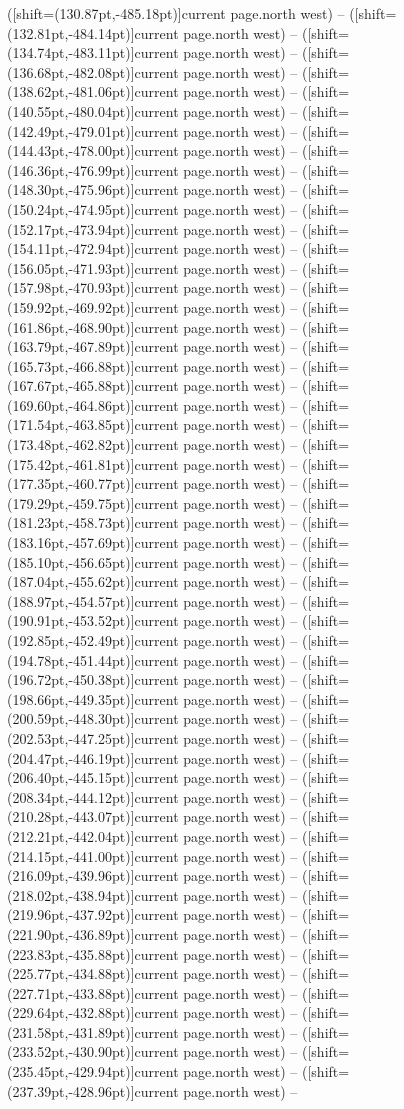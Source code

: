 \documentclass[11pt]{article}
\begin{document}
([shift={(130.87pt,-485.18pt)}]current page.north west) -- ([shift={(132.81pt,-484.14pt)}]current page.north west) -- ([shift={(134.74pt,-483.11pt)}]current page.north west) -- ([shift={(136.68pt,-482.08pt)}]current page.north west) -- ([shift={(138.62pt,-481.06pt)}]current page.north west) -- ([shift={(140.55pt,-480.04pt)}]current page.north west) -- ([shift={(142.49pt,-479.01pt)}]current page.north west) -- ([shift={(144.43pt,-478.00pt)}]current page.north west) -- ([shift={(146.36pt,-476.99pt)}]current page.north west) -- ([shift={(148.30pt,-475.96pt)}]current page.north west) -- ([shift={(150.24pt,-474.95pt)}]current page.north west) -- ([shift={(152.17pt,-473.94pt)}]current page.north west) -- ([shift={(154.11pt,-472.94pt)}]current page.north west) -- ([shift={(156.05pt,-471.93pt)}]current page.north west) -- ([shift={(157.98pt,-470.93pt)}]current page.north west) -- ([shift={(159.92pt,-469.92pt)}]current page.north west) -- ([shift={(161.86pt,-468.90pt)}]current page.north west) -- ([shift={(163.79pt,-467.89pt)}]current page.north west) -- ([shift={(165.73pt,-466.88pt)}]current page.north west) -- ([shift={(167.67pt,-465.88pt)}]current page.north west) -- ([shift={(169.60pt,-464.86pt)}]current page.north west) -- ([shift={(171.54pt,-463.85pt)}]current page.north west) -- ([shift={(173.48pt,-462.82pt)}]current page.north west) -- ([shift={(175.42pt,-461.81pt)}]current page.north west) -- ([shift={(177.35pt,-460.77pt)}]current page.north west) -- ([shift={(179.29pt,-459.75pt)}]current page.north west) -- ([shift={(181.23pt,-458.73pt)}]current page.north west) -- ([shift={(183.16pt,-457.69pt)}]current page.north west) -- ([shift={(185.10pt,-456.65pt)}]current page.north west) -- ([shift={(187.04pt,-455.62pt)}]current page.north west) -- ([shift={(188.97pt,-454.57pt)}]current page.north west) -- ([shift={(190.91pt,-453.52pt)}]current page.north west) -- ([shift={(192.85pt,-452.49pt)}]current page.north west) -- ([shift={(194.78pt,-451.44pt)}]current page.north west) -- ([shift={(196.72pt,-450.38pt)}]current page.north west) -- ([shift={(198.66pt,-449.35pt)}]current page.north west) -- ([shift={(200.59pt,-448.30pt)}]current page.north west) -- ([shift={(202.53pt,-447.25pt)}]current page.north west) -- ([shift={(204.47pt,-446.19pt)}]current page.north west) -- ([shift={(206.40pt,-445.15pt)}]current page.north west) -- ([shift={(208.34pt,-444.12pt)}]current page.north west) -- ([shift={(210.28pt,-443.07pt)}]current page.north west) -- ([shift={(212.21pt,-442.04pt)}]current page.north west) -- ([shift={(214.15pt,-441.00pt)}]current page.north west) -- ([shift={(216.09pt,-439.96pt)}]current page.north west) -- ([shift={(218.02pt,-438.94pt)}]current page.north west) -- ([shift={(219.96pt,-437.92pt)}]current page.north west) -- ([shift={(221.90pt,-436.89pt)}]current page.north west) -- ([shift={(223.83pt,-435.88pt)}]current page.north west) -- ([shift={(225.77pt,-434.88pt)}]current page.north west) -- ([shift={(227.71pt,-433.88pt)}]current page.north west) -- ([shift={(229.64pt,-432.88pt)}]current page.north west) -- ([shift={(231.58pt,-431.89pt)}]current page.north west) -- ([shift={(233.52pt,-430.90pt)}]current page.north west) -- ([shift={(235.45pt,-429.94pt)}]current page.north west) -- ([shift={(237.39pt,-428.96pt)}]current page.north west) -- 
\end{document}

